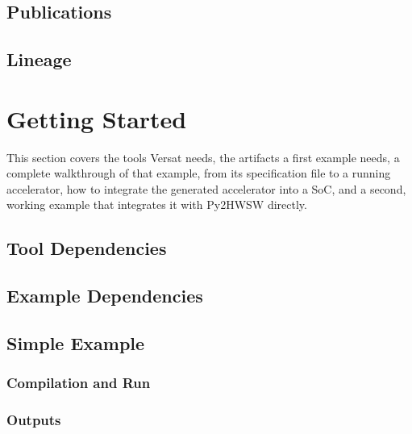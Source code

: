\documentclass{ug}
\begin{document}
\subsection{Publications}
\label{sec:publications}


\subsection{Lineage}
\label{sec:lineage}


\ifdefined\SECTIONCLEARPAGE
\clearpage
\fi
\section{Getting Started}
\label{sec:getting_started}

This section covers the tools Versat needs, the artifacts a first example needs, a complete walkthrough of that example, from its specification file to a running accelerator, how to integrate the generated accelerator into a SoC, and a second, working example that integrates it with Py2HWSW directly.

\subsection{Tool Dependencies}
\label{sec:dependencies}


\subsection{Example Dependencies}
\label{sec:example_dependencies}


\subsection{Simple Example}
\label{sec:simple_example}


\subsubsection{Compilation and Run}
\label{sec:simple_example_run}


\subsubsection{Outputs}
\label{sec:simple_example_outputs}

\end{document}
